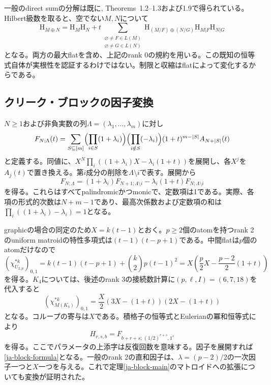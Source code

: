 \documentclass[12pt]{amsart}
\theoremstyle{definition}
\theoremstyle{remark}
\numberwithin{equation}{section}
\newcommand{\HCh}{\mathrm{H}}
\begin{document}
一般のdirect sumの分解は既に\cite{Pie25}, Theorems~1.2--1.3および1.9で得られている。Hilbert級数を取ると、空でない$M,N$について
\begin{equation}\label{ja-known-directsum}
 \HCh_{M\oplus N}=\HCh_M\HCh_N+
 t\sum_{\substack{\varnothing\ne F\in L(M)\\\varnothing\ne G\in L(N)}}
 \HCh_{(M/F)\oplus(N/G)}\HCh_{M|F}\HCh_{N|G}
\end{equation}
となる。両方の最大flatを含め、上記のrank 0の規約を用いる。この既知の恒等式自体が実根性を認証するわけではない。制限と収縮はflatによって変化するからである。


\subsection{クリーク・ブロックの因子変換}
$N\geq1$および非負実数の列$\Lambda=(\lambda_1,\ldots,\lambda_m)$に対し
\begin{equation}\label{ja-factor-def}
 F_{N;\Lambda}(t)=
 \sum_{S\subseteq[m]}
 \Bigl(\prod_{i\in S}(1+\lambda_i)\Bigr)
 \Bigl(\prod_{i\notin S}(-\lambda_i)\Bigr)
 (1+t)^{m-|S|}A_{N+|S|}(t)
\end{equation}
と定義する。同値に、$X^N\prod_i((1+\lambda_i)X-\lambda_i(1+t))$を展開し、各$X^j$を$A_j(t)$で置き換える。第$i$成分の削除を$\Lambda\setminus i$で表す。展開から
\begin{equation}\label{ja-factor-insert}
 F_{N;\Lambda}=(1+\lambda_i)F_{N+1;\Lambda\setminus i}
                  -\lambda_i(1+t)F_{N;\Lambda\setminus i}
\end{equation}
を得る。これらはすべてpalindromicかつmonicで、定数項は1である。実際、各項の形式的次数は$N+m-1$であり、最高次係数および定数項の和は$\prod_i((1+\lambda_i)-\lambda_i)=1$となる。

graphicの場合の同定のため$X=k(t-1)$とおく。$p\geq2$個のatomを持つrank 2のuniform matroidの特性多項式は$(t-1)(t-p+1)$である。中間flatは$p$個のatomだけなので
\[
 (\chi_{U_{2,p}}^{*k})_{0,1}
 =k(t-1)(t-p+1)+\binom{k}{2}p(t-1)^2
 =X\left(\frac p2X-\frac{p-2}{2}(1+t)\right)
\]
を得る。$K_4$については、後述のrank 3の接続数計算に$(p,\ell,I)=(6,7,18)$を代入すると
\begin{equation}\label{ja-k4-factor}
 (\chi_{M(K_4)}^{*k})_{0,1}
 =\frac X2(3X-(1+t))(2X-(1+t))
\end{equation}
となる。コループの寄与は$X$である。積格子の恒等式とEulerianの冪和恒等式により
\begin{equation}\label{ja-block-factor-conversion}
 H_{r,s,b}=F_{b+r+s;\,(1/2)^{r+s},1^s}
\end{equation}
を得る。ここでパラメータの上添字は反復回数を意味する。因子を展開すれば\eqref{ja-block-formula}となる。一般のrank 2の直和因子は、$\lambda=(p-2)/2$の一次因子一つと$X$一つを与える。これで定理\ref{ja-block-main}のマトロイドへの拡張についても変換が証明された。
\end{document}
